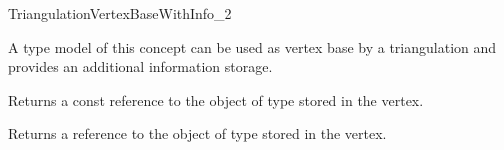 

\begin{ccRefConcept}{TriangulationVertexBaseWithInfo_2}


\ccDefinition
A type model of this concept can be used as vertex base by a triangulation
and provides an additional information storage.



\ccTypes
{}



\ccAccessFunctions
{}

{Returns a const reference to the object of type  stored in the
vertex.} 


{Returns a reference to the object of type  stored in the vertex.} 

\ccHasModels


\end{ccRefConcept}
